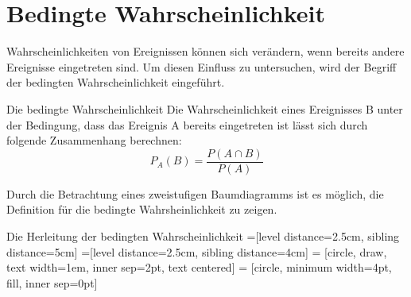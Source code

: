 \section{Bedingte Wahrscheinlichkeit}
Wahrscheinlichkeiten von Ereignissen können sich verändern, wenn bereits andere Ereignisse eingetreten sind. Um diesen Einfluss zu untersuchen, wird der Begriff der bedingten Wahrscheinlichkeit eingeführt.
\begin{defi}{Die bedingte Wahrscheinlichkeit}{}
   Die Wahrscheinlichkeit eines Ereignisses B unter der Bedingung, dass das Ereignis A bereits eingetreten ist lässt sich durch folgende Zusammenhang berechnen: $$P_A(B) = \dfrac{P(A\cap B)}{P(A)}$$   
\end{defi}
Durch die Betrachtung eines zweistufigen Baumdiagramms ist es möglich, die Definition für die bedingte Wahrsheinlichkeit zu zeigen.
\begin{merke*}{Die Herleitung der bedingten Wahrscheinlichkeit}{}
=[level distance=2.5cm, sibling distance=5cm]
=[level distance=2.5cm, sibling distance=4cm]
 = [circle, draw, text width=1em, inner sep=2pt, text centered]
 = [circle, minimum width=4pt, fill, inner sep=0pt]
\end{merke*}